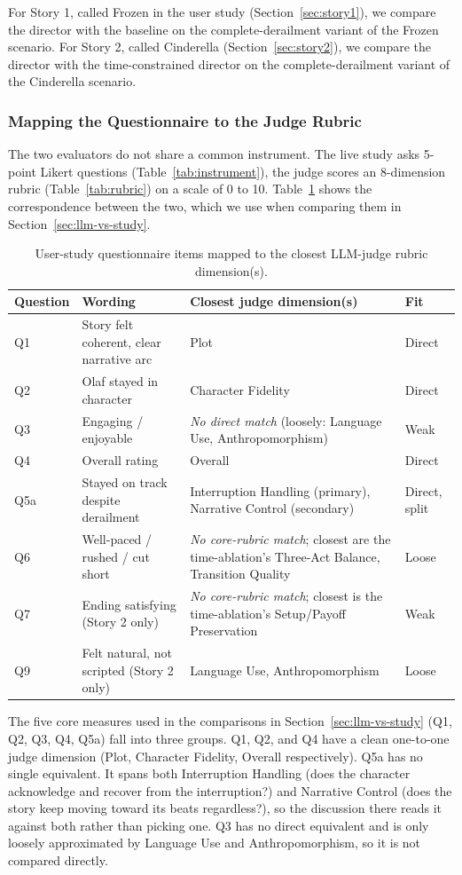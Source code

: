 For Story 1, called Frozen in the user study (Section~\ref{sec:story1}), we compare the director with the baseline on the complete-derailment variant of the Frozen scenario. For Story 2, called Cinderella (Section~\ref{sec:story2}), we compare the director with the time-constrained director on the complete-derailment variant of the Cinderella scenario.

\subsubsection*{Mapping the Questionnaire to the Judge Rubric}\label{sec:llm-vs-study-mapping}
The two evaluators do not share a common instrument. The live study asks 5-point Likert questions (Table~\ref{tab:instrument}), the judge scores an 8-dimension rubric (Table~\ref{tab:rubric}) on a scale of 0 to 10. Table~\ref{tab:question-mapping} shows the correspondence between the two, which we use when comparing them in Section~\ref{sec:llm-vs-study}.

\begin{table}[htbp]
\centering
\caption{User-study questionnaire items mapped to the closest LLM-judge rubric dimension(s).}
\label{tab:question-mapping}
\small
\begin{tabular}{p{2.4cm}p{5.6cm}p{4.3cm}p{1.6cm}}
\toprule
Question & Wording & Closest judge dimension(s) & Fit \\
\midrule
Q1 & Story felt coherent, clear narrative arc & Plot & Direct \\
Q2 & Olaf stayed in character & Character Fidelity & Direct \\
Q3 & Engaging / enjoyable & \emph{No direct match} (loosely: Language Use, Anthropomorphism) & Weak \\
Q4 & Overall rating & Overall & Direct \\
Q5a & Stayed on track despite derailment & Interruption Handling (primary), Narrative Control (secondary) & Direct, split \\
Q6 & Well-paced / rushed / cut short & \emph{No core-rubric match}; closest are the time-ablation's Three-Act Balance, Transition Quality & Loose \\
Q7 & Ending satisfying (Story 2 only) & \emph{No core-rubric match}; closest is the time-ablation's Setup/Payoff Preservation & Weak \\
Q9 & Felt natural, not scripted (Story 2 only) & Language Use, Anthropomorphism & Loose \\
\bottomrule
\end{tabular}
\end{table}

The five core measures used in the comparisons in Section~\ref{sec:llm-vs-study} (Q1, Q2, Q3, Q4, Q5a) fall into three groups. Q1, Q2, and Q4 have a clean one-to-one judge dimension (Plot, Character Fidelity, Overall respectively). Q5a has no single equivalent. It spans both Interruption Handling (does the character acknowledge and recover from the interruption?) and Narrative Control (does the story keep moving toward its beats regardless?), so the discussion there reads it against both rather than picking one. Q3 has no direct equivalent and is only loosely approximated by Language Use and Anthropomorphism, so it is not compared directly.
